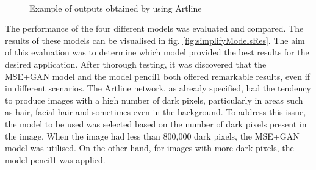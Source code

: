 \begin{figure}[htbp]
    \centering
     \quad
     \\
     \quad
    \caption{Example of outputs obtained by using Artline}
    \label{fig:artlineRes}
\end{figure}
\noindent The performance of the four different models was evaluated and compared. The results of these models can be visualised in fig. \ref{fig:simplifyModelsRes}. The aim of this evaluation was to determine which model provided the best results for the desired application. After thorough testing, it was discovered that the MSE+GAN model and the model pencil1 both offered remarkable results, even if in different scenarios. The Artline network, as already specified, had the tendency to produce images with a high number of dark pixels, particularly in areas such as hair, facial hair and sometimes even in the background. To address this issue, the model to be used was selected based on the number of dark pixels present in the image. When the image had less than 800,000 dark pixels, the MSE+GAN model was utilised. On the other hand, for images with more dark pixels, the model pencil1 was applied.
